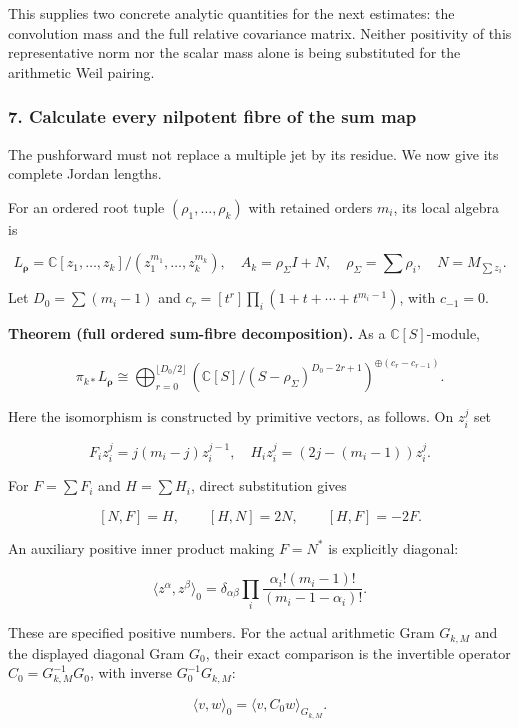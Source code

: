 This supplies two concrete analytic quantities for the next estimates:
the convolution mass and the full relative covariance matrix. Neither
positivity of this representative norm nor the scalar mass alone is
being substituted for the arithmetic Weil pairing.

\subsubsection{7. Calculate every nilpotent fibre of the sum
map}\label{spectral_sum_full:calculate-every-nilpotent-fibre-of-the-sum-map}

The pushforward must not replace a multiple jet by its residue. We now
give its complete Jordan lengths.

For an ordered root tuple \((\rho_1,\ldots,\rho_k)\) with retained
orders \(m_i\), its local algebra is

\[L_{\boldsymbol\rho}=\mathbb C[z_1,\ldots,z_k]/(z_1^{m_1},\ldots,z_k^{m_k}),\quad
A_k=\rho_\Sigma I+N,\quad \rho_\Sigma=\sum\rho_i,\quad N=M_{\sum z_i}.\tag{7.1}\]

Let \(D_0=\sum(m_i-1)\) and \(c_r=[t^r]\prod_i(1+t+\cdots+t^{m_i-1})\),
with \(c_{-1}=0\).

\textbf{Theorem (full ordered sum-fibre decomposition).} As a
\(\mathbb C[S]\)-module,

\[\boxed{\pi_{k*}L_{\boldsymbol\rho}\cong
\bigoplus_{r=0}^{\lfloor D_0/2\rfloor}
\left(\mathbb C[S]/(S-\rho_\Sigma)^{D_0-2r+1}\right)^{\oplus(c_r-c_{r-1})}.}\tag{7.2}\]

Here the isomorphism is constructed by primitive vectors, as follows. On
\(z_i^j\) set

\[F_i z_i^j=j(m_i-j)z_i^{j-1},\quad H_i z_i^j=(2j-(m_i-1))z_i^j.\]

For \(F=\sum F_i\) and \(H=\sum H_i\), direct substitution gives

\[[N,F]=H,\qquad[H,N]=2N,\qquad[H,F]=-2F.\tag{7.3}\]

An auxiliary positive inner product making \(F=N^*\) is explicitly
diagonal:

\[\langle z^\alpha,z^\beta\rangle_0=
\delta_{\alpha\beta}\prod_i\frac{\alpha_i!(m_i-1)!}{(m_i-1-\alpha_i)!}.\tag{7.4}\]

These are specified positive numbers. For the actual arithmetic Gram
\(G_{k,M}\) and the displayed diagonal Gram \(G_0\), their exact
comparison is the invertible operator \(C_0=G_{k,M}^{-1}G_0\), with
inverse \(G_0^{-1}G_{k,M}\):

\[\langle v,w\rangle_0=\langle v,C_0w\rangle_{G_{k,M}}.\tag{7.4a}\]

